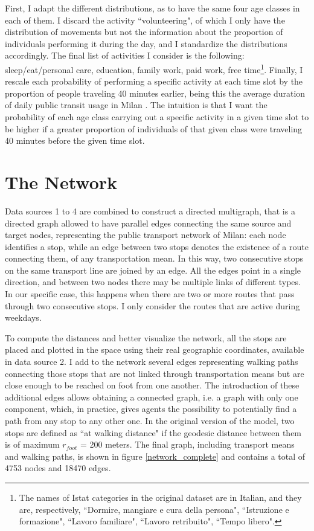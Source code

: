 First, I adapt the different distributions, as to have the same four age classes in each of them. I discard the activity ``volunteering", of which I only have the distribution of movements but not the information about the proportion of individuals performing it during the day, and I standardize the distributions accordingly. The final list of activities I consider is the following: sleep/eat/personal care, education, family work, paid work, free time\footnote{The names of Istat categories in the original dataset are in Italian, and they are, respectively, ``Dormire, mangiare e cura della persona", ``Istruzione e formazione", ``Lavoro familiare", ``Lavoro retribuito", ``Tempo libero".}. Finally, I rescale each probability of performing a specific activity at each time slot by the proportion of people traveling 40 minutes earlier, being this the average duration of daily public transit usage in Milan \cite{bib2}. The intuition is that I want the probability of each age class carrying out a specific activity in a given time slot to be higher if a greater proportion of individuals of that given class were traveling 40 minutes before the given time slot.


\section{The Network}\label{sec:3.2}

Data sources 1 to 4 are combined to construct a directed multigraph, that is a directed graph allowed to have parallel edges connecting the same source and target nodes, representing the public transport network of Milan: each node identifies a stop, while an edge between two stops denotes the existence of a route connecting them, of any transportation mean. In this way, two consecutive stops on the same transport line are joined by an edge. All the edges point in a single direction, and between two nodes there may be multiple links of different types. In our specific case, this happens when there are two or more routes that pass through two consecutive stops. I only consider the routes that are active during weekdays.

To compute the distances and better visualize the network, all the stops are placed and plotted in the space using their real geographic coordinates, available in data source 2.  
I add to the network several edges representing walking paths connecting those stops that are not linked through transportation means but are close enough to be reached on foot from one another. The introduction of these additional edges allows obtaining a connected graph, i.e. a graph with only one component, which, in practice, gives agents the possibility to potentially find a path from any stop to any other one. In the original version of the model, two stops are defined as ``at walking distance" if the geodesic distance between them is of maximum $r_{foot}$ = 200 meters. The final graph, including transport means and walking paths, is shown in figure \ref{network_complete} and contains a total of 4753 nodes and 18470 edges. 

